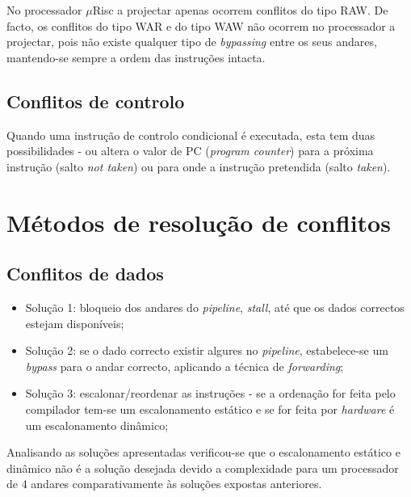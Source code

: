 \documentclass[11pt]{article}
\numberwithin{equation}{section}
\begin{document}
No processador $\mu$Risc a projectar apenas ocorrem conflitos do tipo RAW. De facto, os conflitos do tipo WAR e do tipo WAW não ocorrem no processador a projectar, pois não existe qualquer tipo de \textit{bypassing} entre os seus andares, mantendo-se sempre a ordem das instruções intacta.

\subsection{Conflitos de controlo}

Quando uma instrução de controlo condicional é executada, esta tem duas possibilidades - ou altera o valor de PC (\textit{program counter}) para a próxima instrução (salto \textit{not taken}) ou para onde a instrução pretendida (salto \textit{taken}). 


\section{Métodos de resolução de conflitos}

\subsection{Conflitos de dados}

\begin{itemize}
	\item Solução 1: bloqueio dos andares do \textit{pipeline}, \textit{stall}, até que os dados correctos estejam disponíveis;
	\vspace{-2.5mm}
	\item Solução 2: se o dado correcto existir algures no \textit{pipeline}, estabelece-se um \textit{bypass} para o andar correcto, aplicando a técnica de \textit{forwarding};
	\vspace{-2.5mm}
	\item Solução 3: escalonar/reordenar as instruções - se a ordenação for feita pelo compilador tem-se um escalonamento estático e se for feita por \textit{hardware} é um escalonamento dinâmico;
\end{itemize}

\vspace{-1.5mm}

Analisando as soluções apresentadas verificou-se que o escalonamento estático e dinâmico não é a solução desejada devido a complexidade para um processador de 4 andares comparativamente às soluções expostas anteriores. 
\end{document}
